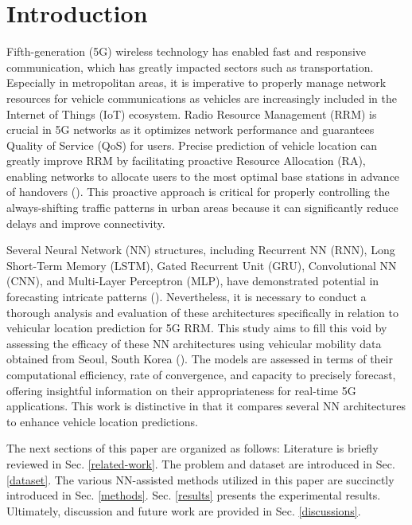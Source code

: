 \documentclass[journal,onecolumn]{IEEEtran}
\begin{document}
\section{Introduction} \label{introduction}
Fifth-generation (5G) wireless technology has enabled fast and responsive communication, which has greatly impacted sectors such as transportation. Especially in metropolitan areas, it is imperative to properly manage network resources for vehicle communications as vehicles are increasingly included in the Internet of Things (IoT) ecosystem. Radio Resource Management (RRM) is crucial in 5G networks as it optimizes network performance and guarantees Quality of Service (QoS) for users. Precise prediction of vehicle location can greatly improve RRM by facilitating proactive Resource Allocation (RA), enabling networks to allocate users to the most optimal base stations in advance of handovers (\cite{7931566}). This proactive approach is critical for properly controlling the always-shifting traffic patterns in urban areas because it can significantly reduce delays and improve connectivity.

Several Neural Network (NN) structures, including Recurrent NN (RNN), Long Short-Term Memory (LSTM), Gated Recurrent Unit (GRU), Convolutional NN (CNN), and Multi-Layer Perceptron (MLP), have demonstrated potential in forecasting intricate patterns (\cite{6795963,9204396}). Nevertheless, it is necessary to conduct a thorough analysis and evaluation of these architectures specifically in relation to vehicular location prediction for 5G RRM. This study aims to fill this void by assessing the efficacy of these NN architectures using vehicular mobility data obtained from Seoul, South Korea (\cite{dataset20kumbhar}). The models are assessed in terms of their computational efficiency, rate of convergence, and capacity to precisely forecast, offering insightful information on their appropriateness for real-time 5G applications. This work is distinctive in that it compares several NN architectures to enhance vehicle location predictions.

The next sections of this paper are organized as follows: Literature is briefly reviewed in Sec. \ref{related-work}. The problem and dataset are introduced in Sec. \ref{dataset}. The various NN-assisted methods utilized in this paper are succinctly introduced in Sec. \ref{methods}. Sec. \ref{results} presents the experimental results. Ultimately, discussion and future work are provided in Sec. \ref{discussions}.
\clearpage
\end{document}
